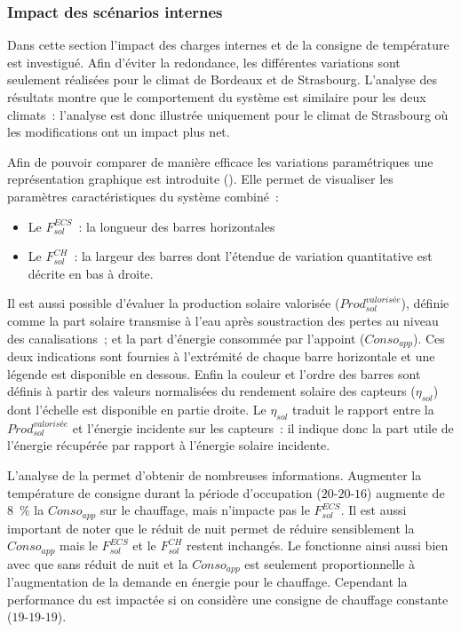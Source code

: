 \subsubsection{Impact des scénarios internes} %
\label{ssub:impact_des_scenarios_internes}
Dans cette section l’impact des charges internes et de la consigne de température est
investigué. Afin d’éviter la redondance, les différentes variations sont seulement
réalisées pour le climat de Bordeaux et de Strasbourg. L’analyse des résultats montre
que le comportement du système est similaire pour les deux climats~: l’analyse est donc
illustrée uniquement pour le climat de Strasbourg où les modifications ont un impact plus
net.

Afin de pouvoir comparer de manière efficace les variations paramétriques une
représentation graphique est introduite (). Elle permet
de visualiser les paramètres caractéristiques du système combiné~:
\begin{itemize}
    \item Le $F_{sol}^{ECS}$~: la longueur des barres horizontales
    \item Le $F_{sol}^{CH}$~: la largeur des barres dont l’étendue de variation quantitative
          est décrite en bas à droite.
\end{itemize}
Il est aussi possible d’évaluer la production solaire valorisée
($Prod_{sol}^{valorisée}$), définie comme la part solaire transmise à l’eau après
soustraction des pertes au niveau des canalisations~; et la part d’énergie consommée
par l’appoint ($Conso_{app}$). Ces deux indications sont fournies à l’extrémité de chaque
barre horizontale et une légende est disponible en dessous.
Enfin la couleur et l’ordre des barres sont définis à partir des valeurs normalisées
du rendement solaire des capteurs ($\eta_{sol}$) dont l’échelle est disponible en partie droite. Le
$\eta_{sol}$ traduit le rapport entre la $Prod_{sol}^{valorisée}$ et l’énergie
incidente sur les capteurs~: il indique donc la part utile de l’énergie récupérée par rapport à
l’énergie solaire incidente.

L’analyse de la  permet d’obtenir de nombreuses
informations. Augmenter la température de consigne durant la période
d’occupation ($20$-$20$-$16$) augmente de \SI{8}{\percent} la $Conso_{app}$
sur le chauffage, mais n’impacte pas le $F_{sol}^{ECS}$. Il est aussi important de noter que le
réduit de nuit permet de réduire sensiblement la $Conso_{app}$ mais le $F_{sol}^{ECS}$ et le
$F_{sol}^{CH}$ restent inchangés. Le  fonctionne ainsi aussi bien avec que sans réduit de
nuit et la $Conso_{app}$ est seulement proportionnelle à l’augmentation de la demande en
énergie pour le chauffage. Cependant la performance du  est impactée si on considère
une consigne de chauffage constante ($19$-$19$-$19$).

